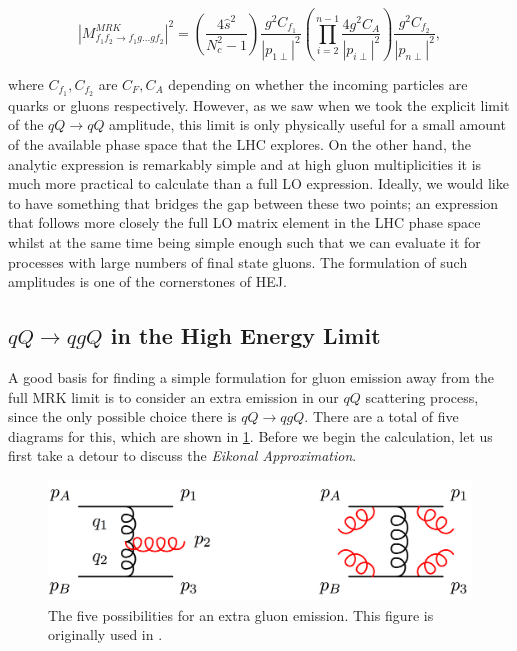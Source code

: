 \begin{equation}
|M^{MRK}_{f_1 f_2 \to f_1 g ... g f_2}|^2 = \left(\frac{4 \hat{s}^2}{N_c^2 - 1} \right) \frac{g^2 C_{f_1}}{|p_{1 \perp}|^2} \left(\prod_{i = 2}^{n-1} \frac{4 g^2 C_A}{|p_{i \perp}|^2} \right)  \frac{g^2 C_{f_2}}{|p_{n \perp}|^2} ,
\end{equation}

where $C_{f_1}, C_{f_2}$ are $C_F, C_A $ depending on whether the incoming particles are quarks or gluons respectively. However, as we saw when we took the explicit limit of the $qQ \to qQ$ amplitude, this limit is only physically useful for a small amount of the available phase space that the LHC explores. On the other hand, the analytic expression is remarkably simple and at high gluon multiplicities it is much more practical to calculate than a full LO expression. Ideally, we would like to have something that bridges the gap between these two points; an expression that follows more closely the full LO matrix element in the LHC phase space whilst at the same time being simple enough such that we can evaluate it for processes with large numbers of final state gluons. The formulation of such amplitudes is one of the cornerstones of HEJ. 

\subsection{$qQ \to qgQ$ in the High Energy Limit}

A good basis for finding a simple formulation for gluon emission away from the full MRK limit is to consider an extra emission in our $qQ$ scattering process, since the only possible choice there is $qQ \to qgQ$. There are a total of five diagrams for this, which are shown in \ref{fig:qQqgQ}. Before we begin the calculation, let us first take a detour to discuss the \emph{Eikonal Approximation}.

\begin{figure}[t]
\centering
\includegraphics[scale=0.3]{Images/gluon_emission.png} 
\caption{The five possibilities for an extra gluon emission. This figure is originally used in \cite{Andersen2009a}.}
\label{fig:qQqgQ}
\end{figure}

